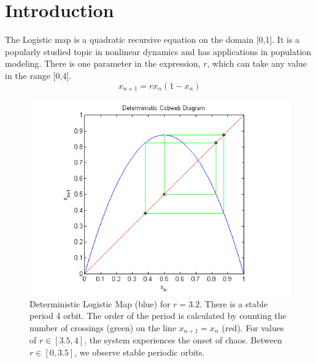 \documentclass[12pt]{article}
\begin{document}
\section{Introduction}
\hspace{5mm}The Logistic map is a quadratic recursive equation on the domain
[0,1]. It is a popularly studied topic in nonlinear dynamics and has
applications in population modeling. There is one parameter in the
expression, $r$, which can take any value in the range [0,4]. 
\begin{equation*}
x_{n+1} = rx_n(1-x_n)
\end{equation*}
\begin{figure}[H]
	\begin{center}
		\includegraphics[scale=0.7]{det_cobweb}
\caption{Deterministic Logistic Map (blue) for $r=3.2$. There is a stable period
4 orbit. The order of the period is calculated by counting the number
of crossings (green) on the line $x_{n+1}=x_n$ (red). For values of $r \in [3.5,4]$, the system experiences the onset of
chaos. Between $r \in [0,3.5]$, we observe stable periodic orbits.}
	\end{center}
\end{figure}
\end{document}
